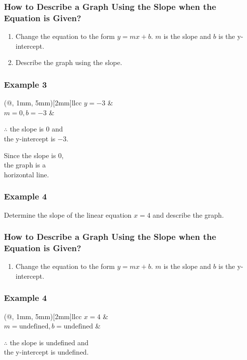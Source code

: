 \documentclass[14pt]{beamer}
\begin{document}
    \begin{frame}
    	\frametitle{How to Describe a Graph Using the Slope when the Equation is Given?}
    	\begin{enumerate}  
    		\item Change the equation to the form $ y = mx + b $. $ m $ is the slope and $ b $ is the y-intercept.
    		\item Describe the graph using the slope.
    	\end{enumerate}  
    \end{frame}
    
    \begin{frame}
    	\frametitle{Example 3}
    	
    	\begin{TAB}(@, 1mm, 5mm)[2mm]{ll}{cc}
    		$ y = -3 $  &  \\
    		
    		$ m = 0, b = -3 $ & \\
    	\end{TAB}
    	
    	$ \therefore $ the slope is $ 0 $ and \\ the y-intercept is $ -3 $.
    	
    	\vone
    	
    	\pause Since the slope is $ 0 $, \\ the graph is a\\ horizontal line.
    	
    	\pause {}
    \end{frame}
    
    \begin{frame}
    	\frametitle{Example 4}
    	Determine the slope of the linear equation $ x = 4 $ and describe the graph.
    \end{frame}
    
    \begin{frame}
    	\frametitle{How to Describe a Graph Using the Slope when the Equation is Given?}
    	\begin{enumerate}  
    		\item Change the equation to the form $ y = mx + b $. $ m $ is the slope and $ b $ is the y-intercept.
    	\end{enumerate}  
    \end{frame}
    
    \begin{frame}
    	\frametitle{Example 4}
    	
    	\begin{TAB}(@, 1mm, 5mm)[2mm]{ll}{cc}
    		$ x = 4 $  &  \\
    		    		
    		\pause  $ m = \text{undefined}, b = \text{undefined} $ & \\
    	\end{TAB}
    	
    	\pause $ \therefore $ the slope is undefined and \\ the y-intercept is undefined.
    \end{frame}
    
\end{document}
